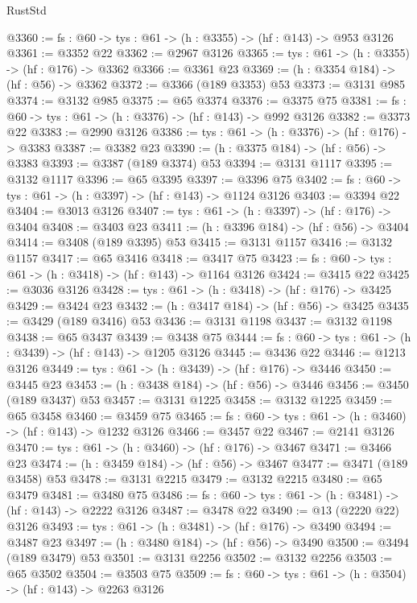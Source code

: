 \begin{lexlean}{RustStd}
\begin{coremodule}
@3360 := {fs : @60} -> {tys : @61} -> (h : @3355) -> (hf : @143) -> @953 @3126
@3361 := @3352 @22
@3362 := @2967 @3126
@3365 := {tys : @61} -> (h : @3355) -> (hf : @176) -> @3362
@3366 := @3361 @23
@3369 := (h : @3354 @184) -> (hf : @56) -> @3362
@3372 := @3366 (@189 @3353) @53
@3373 := @3131 @985
@3374 := @3132 @985
@3375 := @65 @3374
@3376 := @3375 @75
@3381 := {fs : @60} -> {tys : @61} -> (h : @3376) -> (hf : @143) -> @992 @3126
@3382 := @3373 @22
@3383 := @2990 @3126
@3386 := {tys : @61} -> (h : @3376) -> (hf : @176) -> @3383
@3387 := @3382 @23
@3390 := (h : @3375 @184) -> (hf : @56) -> @3383
@3393 := @3387 (@189 @3374) @53
@3394 := @3131 @1117
@3395 := @3132 @1117
@3396 := @65 @3395
@3397 := @3396 @75
@3402 := {fs : @60} -> {tys : @61} -> (h : @3397) -> (hf : @143) -> @1124 @3126
@3403 := @3394 @22
@3404 := @3013 @3126
@3407 := {tys : @61} -> (h : @3397) -> (hf : @176) -> @3404
@3408 := @3403 @23
@3411 := (h : @3396 @184) -> (hf : @56) -> @3404
@3414 := @3408 (@189 @3395) @53
@3415 := @3131 @1157
@3416 := @3132 @1157
@3417 := @65 @3416
@3418 := @3417 @75
@3423 := {fs : @60} -> {tys : @61} -> (h : @3418) -> (hf : @143) -> @1164 @3126
@3424 := @3415 @22
@3425 := @3036 @3126
@3428 := {tys : @61} -> (h : @3418) -> (hf : @176) -> @3425
@3429 := @3424 @23
@3432 := (h : @3417 @184) -> (hf : @56) -> @3425
@3435 := @3429 (@189 @3416) @53
@3436 := @3131 @1198
@3437 := @3132 @1198
@3438 := @65 @3437
@3439 := @3438 @75
@3444 := {fs : @60} -> {tys : @61} -> (h : @3439) -> (hf : @143) -> @1205 @3126
@3445 := @3436 @22
@3446 := @1213 @3126
@3449 := {tys : @61} -> (h : @3439) -> (hf : @176) -> @3446
@3450 := @3445 @23
@3453 := (h : @3438 @184) -> (hf : @56) -> @3446
@3456 := @3450 (@189 @3437) @53
@3457 := @3131 @1225
@3458 := @3132 @1225
@3459 := @65 @3458
@3460 := @3459 @75
@3465 := {fs : @60} -> {tys : @61} -> (h : @3460) -> (hf : @143) -> @1232 @3126
@3466 := @3457 @22
@3467 := @2141 @3126
@3470 := {tys : @61} -> (h : @3460) -> (hf : @176) -> @3467
@3471 := @3466 @23
@3474 := (h : @3459 @184) -> (hf : @56) -> @3467
@3477 := @3471 (@189 @3458) @53
@3478 := @3131 @2215
@3479 := @3132 @2215
@3480 := @65 @3479
@3481 := @3480 @75
@3486 := {fs : @60} -> {tys : @61} -> (h : @3481) -> (hf : @143) -> @2222 @3126
@3487 := @3478 @22
@3490 := @13 (@2220 @22) @3126
@3493 := {tys : @61} -> (h : @3481) -> (hf : @176) -> @3490
@3494 := @3487 @23
@3497 := (h : @3480 @184) -> (hf : @56) -> @3490
@3500 := @3494 (@189 @3479) @53
@3501 := @3131 @2256
@3502 := @3132 @2256
@3503 := @65 @3502
@3504 := @3503 @75
@3509 := {fs : @60} -> {tys : @61} -> (h : @3504) -> (hf : @143) -> @2263 @3126

\end{coremodule}
\end{lexlean}
